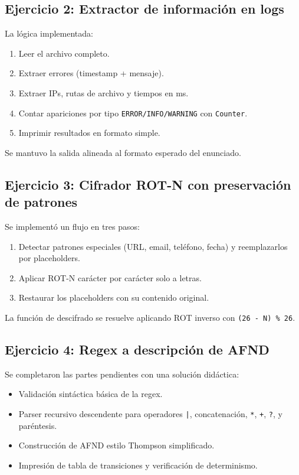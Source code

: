 \documentclass[12pt]{article}
\begin{document}
\subsection{Ejercicio 2: Extractor de información en logs}
La lógica implementada:
\begin{enumerate}[leftmargin=*]
    \item Leer el archivo completo.
    \item Extraer errores (timestamp + mensaje).
    \item Extraer IPs, rutas de archivo y tiempos en ms.
    \item Contar apariciones por tipo \texttt{ERROR/INFO/WARNING} con \texttt{Counter}.
    \item Imprimir resultados en formato simple.
\end{enumerate}

Se mantuvo la salida alineada al formato esperado del enunciado.

\subsection{Ejercicio 3: Cifrador ROT-N con preservación de patrones}
Se implementó un flujo en tres pasos:
\begin{enumerate}[leftmargin=*]
    \item Detectar patrones especiales (URL, email, teléfono, fecha) y reemplazarlos por placeholders.
    \item Aplicar ROT-N carácter por carácter solo a letras.
    \item Restaurar los placeholders con su contenido original.
\end{enumerate}

La función de descifrado se resuelve aplicando ROT inverso con \texttt{(26 - N) \% 26}.

\subsection{Ejercicio 4: Regex a descripción de AFND}
Se completaron las partes pendientes con una solución didáctica:
\begin{itemize}[leftmargin=*]
    \item Validación sintáctica básica de la regex.
    \item Parser recursivo descendente para operadores \texttt{|}, concatenación, \texttt{*}, \texttt{+}, \texttt{?}, y paréntesis.
    \item Construcción de AFND estilo Thompson simplificado.
    \item Impresión de tabla de transiciones y verificación de determinismo.
\end{itemize}
\end{document}
